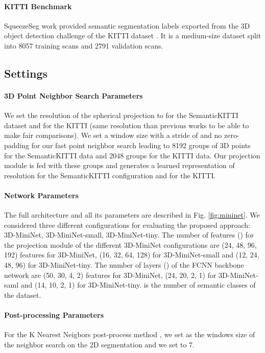 \documentclass[letterpaper, 10 pt, journal, twoside]{IEEEtran}
\begin{document}
\paragraph*{KITTI Benchmark}
SqueezeSeg \cite{wu2018squeezeseg} work provided semantic segmentation labels exported from the 3D object detection challenge of the KITTI dataset \cite{geiger2012wekitti}. It is a medium-size dataset split into 8057 training scans and 2791 validation scans.

 


\subsection{Settings}
\label{sec:settings}

\paragraph{3D Point Neighbor Search Parameters}
We set the resolution of the spherical projection to   for the SemanticKITTI dataset and  for the KITTI (same resolution than previous works to be able to make fair comparisons). 
We set a   window size with a stride of  and no zero-padding for our fast point neighbor search leading to 8192 groups of 3D points for the SemanticKITTI data and 2048 groups for the KITTI data.
Our projection module is fed with these groups and generates a learned representation of resolution   for the SemanticKITTI configuration and  for the KITTI. 

\paragraph{Network Parameters}
\label{sec:network-parameters}
The full architecture and all its parameters are described in Fig. \ref{fig:mininet}. We considered three different configurations for evaluating the proposed approach: 3D-MiniNet, 3D-MiniNet-small, 3D-MiniNet-tiny.
 The number of features () for the projection module of the different 3D-MiniNet configurations are (24, 48, 96, 192) features for 3D-MiniNet,  (16, 32, 64, 128) for 3D-MiniNet-small and   (12, 24, 48, 96) for 3D-MiniNet-tiny.
The number of layers () of the FCNN backbone network are (50, 30, 4, 2) features for 3D-MiniNet,  (24, 20, 2, 1) for 3D-MiniNet-saml and   (14, 10, 2, 1) for 3D-MiniNet-tiny.  is the number of semantic classes of the dataset.

\paragraph{Post-processing Parameters}
For the K Nearest Neigbors post-process method \cite{milioto2019rangenet++}, we set as  the windows size of the neighbor search on the 2D segmentation and we set  to 7.
\end{document}
